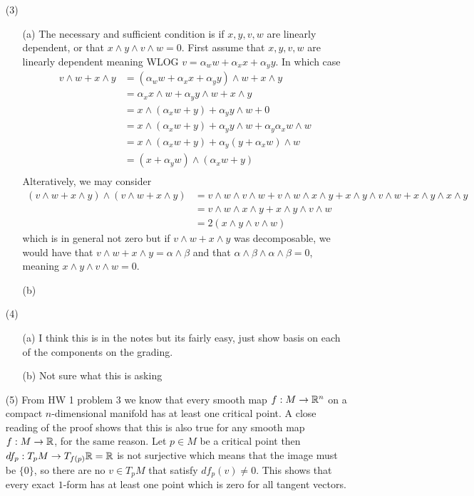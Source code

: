 \documentclass[12pt]{amsart}
\begin{document}
\begin{itemize}
    \item[(3)]
    \begin{itemize}
        \item[(a)] %
        The necessary and sufficient condition is if $x,y,v,w$ are linearly dependent, or that $x\wedge y\wedge v\wedge w=0$.
        First assume that $x,y,v,w$ are linearly dependent meaning WLOG $v=\alpha_ww+\alpha_xx+\alpha_yy$.
        In which case 
        \begin{align*}
            v\wedge w+x\wedge y &= (\alpha_ww+\alpha_xx+\alpha_yy)\wedge w+x\wedge y\\
            &= \alpha_xx\wedge w+\alpha_yy\wedge w+x\wedge y\\
            &= x\wedge(\alpha_x w+y)+\alpha_yy\wedge w+0\\
            &= x\wedge(\alpha_x w+y)+\alpha_yy\wedge w+\alpha_y\alpha_xw\wedge w\\
            &= x\wedge(\alpha_x w+y)+\alpha_y(y+\alpha_xw)\wedge w\\
            &= (x+ \alpha_y w)\wedge(\alpha_x w+y)\\
        \end{align*}
        Alteratively, we may consider
        \begin{align*}
            (v\wedge w+x\wedge y)\wedge (v\wedge w+x\wedge y) &= 
            v\wedge w\wedge v\wedge w + v\wedge w\wedge x\wedge y + x\wedge y\wedge v\wedge w + x\wedge y\wedge x\wedge y\\
            &= v\wedge w\wedge x\wedge y + x\wedge y\wedge v\wedge w\\
            &= 2(x\wedge y\wedge v\wedge w)
        \end{align*}
        which is in general not zero but if $v\wedge w+x\wedge y$ was decomposable, we would have that $v\wedge w+x\wedge y=\alpha\wedge\beta$ and that $\alpha\wedge\beta\wedge \alpha\wedge\beta=0$, meaning $x\wedge y\wedge v\wedge w=0$.
        \item[(b)]
    \end{itemize}
    \item[(4)]
    \begin{itemize}
        \item[(a)] I think this is in the notes but its fairly easy, just show basis on each of the components on the grading.
        \item[(b)] Not sure what this is asking 
    \end{itemize}
    \item[(5)] %
    From HW 1 problem 3 we know that every smooth map $f:M\rightarrow \mathbb{R}^n$ on a compact $n$-dimensional manifold has at least one critical point. A close reading of the proof shows that this is also true for any smooth map $f:M\rightarrow \mathbb{R}$, for the same reason.
    Let $p\in M$ be a critical point then $df_p: T_pM\rightarrow T_{f(p)}\mathbb{R}=\mathbb{R}$ is not surjective which means that the image must be $\{0\}$, so there are no $v\in T_pM$ that satisfy $df_p(v)\neq 0$.
    This shows that every exact $1$-form has at least one point which is zero for all tangent vectors.
\end{itemize}
\end{document}
